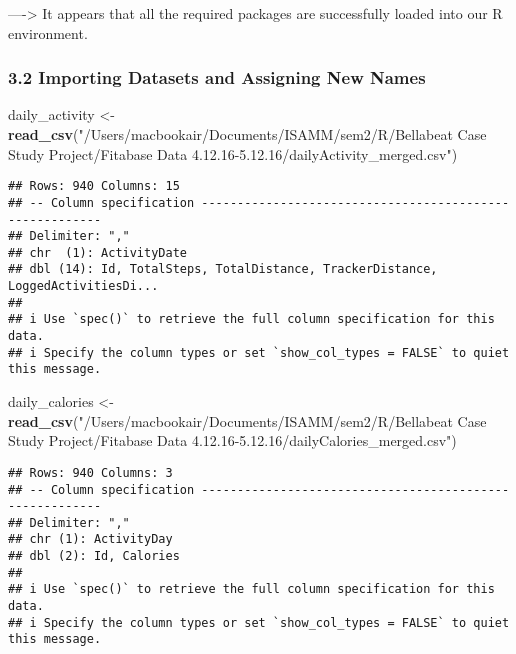 \documentclass[
]{article}
\newenvironment{Shaded}{\begin{snugshade}}{\end{snugshade}}
\newcommand{\FunctionTok}[1]{\textcolor[rgb]{0.13,0.29,0.53}{\textbf{#1}}}
\newcommand{\NormalTok}[1]{#1}
\newcommand{\OtherTok}[1]{\textcolor[rgb]{0.56,0.35,0.01}{#1}}
\newcommand{\StringTok}[1]{\textcolor[rgb]{0.31,0.60,0.02}{#1}}
\begin{document}
----\textgreater{} It appears that all the required packages are
successfully loaded into our R environment.

\hypertarget{importing-datasets-and-assigning-new-names}{%
\subsubsection{3.2 Importing Datasets and Assigning New
Names}\label{importing-datasets-and-assigning-new-names}}

\begin{Shaded}
\begin{Highlighting}[]
\NormalTok{daily\_activity }\OtherTok{\textless{}{-}} \FunctionTok{read\_csv}\NormalTok{(}\StringTok{"/Users/macbookair/Documents/ISAMM/sem2/R/Bellabeat Case Study Project/Fitabase Data 4.12.16{-}5.12.16/dailyActivity\_merged.csv"}\NormalTok{)}
\end{Highlighting}
\end{Shaded}

\begin{verbatim}
## Rows: 940 Columns: 15
## -- Column specification --------------------------------------------------------
## Delimiter: ","
## chr  (1): ActivityDate
## dbl (14): Id, TotalSteps, TotalDistance, TrackerDistance, LoggedActivitiesDi...
## 
## i Use `spec()` to retrieve the full column specification for this data.
## i Specify the column types or set `show_col_types = FALSE` to quiet this message.
\end{verbatim}

\begin{Shaded}
\begin{Highlighting}[]
\NormalTok{daily\_calories }\OtherTok{\textless{}{-}} \FunctionTok{read\_csv}\NormalTok{(}\StringTok{"/Users/macbookair/Documents/ISAMM/sem2/R/Bellabeat Case Study Project/Fitabase Data 4.12.16{-}5.12.16/dailyCalories\_merged.csv"}\NormalTok{)}
\end{Highlighting}
\end{Shaded}

\begin{verbatim}
## Rows: 940 Columns: 3
## -- Column specification --------------------------------------------------------
## Delimiter: ","
## chr (1): ActivityDay
## dbl (2): Id, Calories
## 
## i Use `spec()` to retrieve the full column specification for this data.
## i Specify the column types or set `show_col_types = FALSE` to quiet this message.
\end{verbatim}
\end{document}
